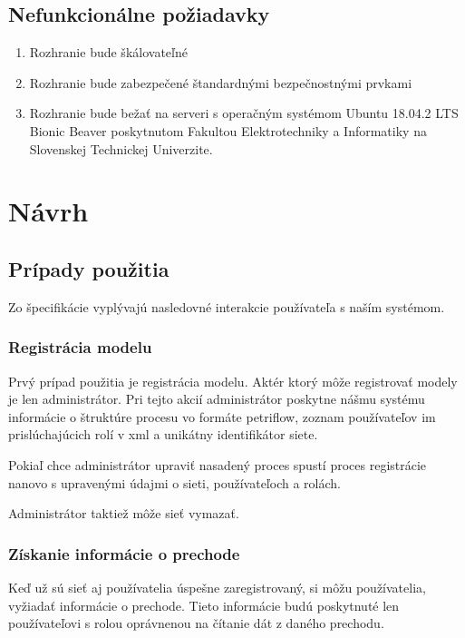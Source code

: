 \subsection{Nefunkcionálne požiadavky}  
\begin{enumerate}  
	
	\item Rozhranie bude škálovateľné  
	
	\item Rozhranie bude zabezpečené štandardnými bezpečnostnými prvkami 

	\item Rozhranie bude bežať na serveri s operačným systémom Ubuntu 18.04.2 LTS Bionic Beaver poskytnutom Fakultou Elektrotechniky a Informatiky na Slovenskej Technickej Univerzite.   
	
\end{enumerate}  



\section{Návrh}  




\subsection{Prípady použitia} 
Zo špecifikácie vyplývajú nasledovné interakcie používateľa s naším systémom. 


\subsubsection{Registrácia modelu} 
Prvý prípad použitia je registrácia modelu. Aktér ktorý môže registrovať modely je len administrátor. Pri tejto akcií administrátor poskytne nášmu systému informácie o štruktúre procesu vo formáte petriflow, zoznam používateľov im prislúchajúcich rolí v \acrshort{xml} a unikátny identifikátor siete.  

Pokiaľ chce administrátor upraviť nasadený proces spustí proces registrácie nanovo s upravenými údajmi o sieti, používateľoch a rolách. 

Administrátor taktiež môže sieť vymazať. 


\subsubsection{Získanie informácie o prechode} 
Keď už sú sieť aj používatelia úspešne zaregistrovaný, si môžu používatelia, vyžiadať informácie o prechode. Tieto informácie budú poskytnuté len používateľovi s rolou oprávnenou na čítanie dát z daného prechodu. 

